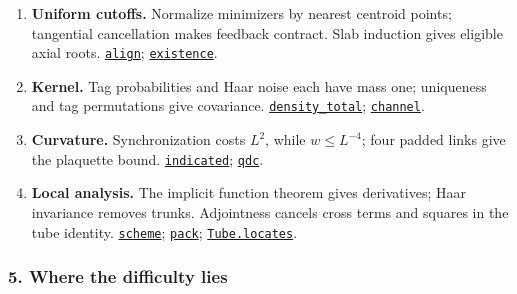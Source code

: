 \documentclass[
  letterpaper,
  11pt]{article}
\providecommand{\tightlist}{%
  \setlength{\itemsep}{0pt}\setlength{\parskip}{0pt}}
\begin{document}
\begin{enumerate}
\def\labelenumi{\arabic{enumi}.}
\tightlist
\item
  \textbf{Uniform cutoffs.} Normalize minimizers by nearest centroid
  points; tangential cancellation makes feedback contract. Slab
  induction gives eligible axial roots.
  \href{https://github.com/yang-mills-group/OpenAI-YM-20261028/blob/3456e5e75cf8d4cd558955a5c7638fba2d68f464/YM/Branch/Synchronize.lean\#L232-L272}{\texttt{align}};
  \href{https://github.com/yang-mills-group/OpenAI-YM-20261028/blob/3456e5e75cf8d4cd558955a5c7638fba2d68f464/YM/Branch/Pick.lean\#L80-L105}{\texttt{existence}}.
\item
  \textbf{Kernel.} Tag probabilities and Haar noise each have mass one;
  uniqueness and tag permutations give covariance.
  \href{https://github.com/yang-mills-group/OpenAI-YM-20261028/blob/3456e5e75cf8d4cd558955a5c7638fba2d68f464/YM/RG/Block.lean\#L197-L201}{\texttt{density\_total}};
  \href{https://github.com/yang-mills-group/OpenAI-YM-20261028/blob/3456e5e75cf8d4cd558955a5c7638fba2d68f464/YM/Branch/Covariant.lean\#L50-L54}{\texttt{channel}}.
\item
  \textbf{Curvature.} Synchronization costs \(L^2\), while
  \(w\le L^{-4}\); four padded links give the plaquette bound.
  \href{https://github.com/yang-mills-group/OpenAI-YM-20261028/blob/3456e5e75cf8d4cd558955a5c7638fba2d68f464/YM/Pressure/Cost.lean\#L129-L179}{\texttt{indicated}};
  \href{https://github.com/yang-mills-group/OpenAI-YM-20261028/blob/3456e5e75cf8d4cd558955a5c7638fba2d68f464/YM/Pressure/Cost.lean\#L210-L252}{\texttt{qdc}}.
\item
  \textbf{Local analysis.} The implicit function theorem gives
  derivatives; Haar invariance removes trunks. Adjointness cancels cross
  terms and squares in the tube identity.
  \href{https://github.com/yang-mills-group/OpenAI-YM-20261028/blob/3456e5e75cf8d4cd558955a5c7638fba2d68f464/YM/PREC/Pred.lean\#L129-L187}{\texttt{scheme}};
  \href{https://github.com/yang-mills-group/OpenAI-YM-20261028/blob/3456e5e75cf8d4cd558955a5c7638fba2d68f464/YM/Tree/Cut.lean\#L81-L111}{\texttt{pack}};
  \href{https://github.com/yang-mills-group/OpenAI-YM-20261028/blob/3456e5e75cf8d4cd558955a5c7638fba2d68f464/YM/Pressure/Rows.lean\#L145-L163}{\texttt{Tube.locates}}.
\end{enumerate}

\subsubsection{5. Where the difficulty
lies}\label{where-the-difficulty-lies-3}
\end{document}
